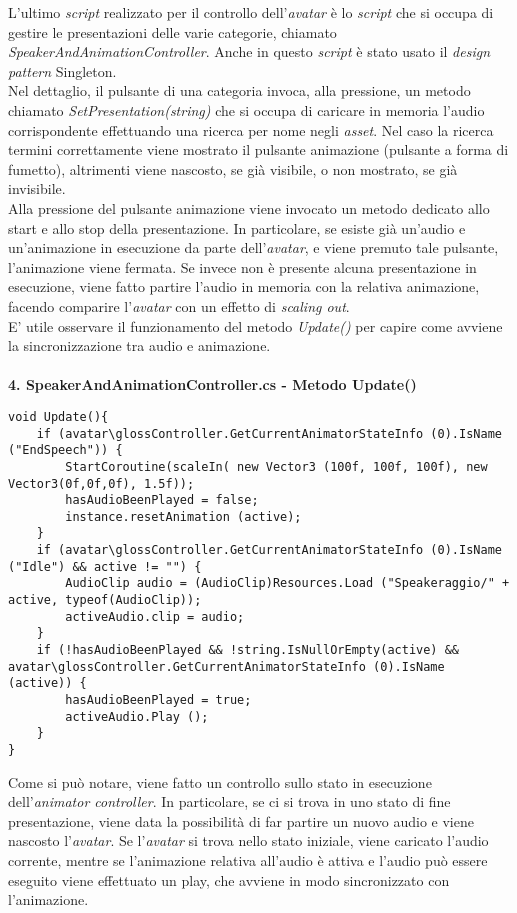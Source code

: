 L'ultimo \textit{script} realizzato per il controllo dell'\textit{avatar\gloss} \`e lo \textit{script} che si occupa di gestire le presentazioni delle varie categorie, chiamato \textit{SpeakerAndAnimationController}. Anche in questo \textit{script} \`e stato usato il \textit{design pattern} Singleton.\\
Nel dettaglio, il pulsante di una categoria invoca, alla pressione, un metodo chiamato \textit{SetPresentation(string)} che si occupa di caricare in memoria l'audio corrispondente effettuando una ricerca per nome negli \textit{asset\gloss}. Nel caso la ricerca termini correttamente viene mostrato il pulsante animazione (pulsante a forma di fumetto), altrimenti viene nascosto, se gi\`a visibile, o non mostrato, se gi\`a invisibile.\\
Alla pressione del pulsante animazione viene invocato un metodo dedicato allo start e allo stop della presentazione. In particolare, se esiste gi\`a un'audio e un'animazione in esecuzione da parte dell'\textit{avatar\gloss}, e viene premuto tale pulsante, l'animazione viene fermata. Se invece  non \`e presente alcuna presentazione in esecuzione, viene fatto partire l'audio in memoria con la relativa animazione, facendo comparire l'\textit{avatar\gloss} con un effetto di \textit{scaling out}.\\
E' utile osservare il funzionamento del metodo \textit{Update()} per capire come avviene la sincronizzazione tra audio e animazione.
\\\\
\textbf{4. SpeakerAndAnimationController.cs - Metodo Update()}
\begin{lstlisting}
void Update(){
	if (avatar\glossController.GetCurrentAnimatorStateInfo (0).IsName ("EndSpeech")) {
		StartCoroutine(scaleIn( new Vector3 (100f, 100f, 100f), new Vector3(0f,0f,0f), 1.5f));
		hasAudioBeenPlayed = false;
		instance.resetAnimation (active);
	}
	if (avatar\glossController.GetCurrentAnimatorStateInfo (0).IsName ("Idle") && active != "") {
		AudioClip audio = (AudioClip)Resources.Load ("Speakeraggio/" + active, typeof(AudioClip));
		activeAudio.clip = audio;
	}
	if (!hasAudioBeenPlayed && !string.IsNullOrEmpty(active) && avatar\glossController.GetCurrentAnimatorStateInfo (0).IsName (active)) {
		hasAudioBeenPlayed = true;
		activeAudio.Play ();
	}
}
\end{lstlisting}

Come si pu\`o notare, viene fatto un controllo sullo stato in esecuzione dell'\textit{animator controller}. In particolare, se ci si trova in uno stato di fine presentazione, viene data la possibilit\`a di far partire un nuovo audio e viene nascosto l'\textit{avatar\gloss}.
Se l'\textit{avatar\gloss} si trova nello stato iniziale, viene caricato l'audio corrente, mentre se l'animazione relativa all'audio \`e attiva e l'audio pu\`o essere eseguito viene effettuato un play, che avviene in modo sincronizzato con l'animazione.\\

